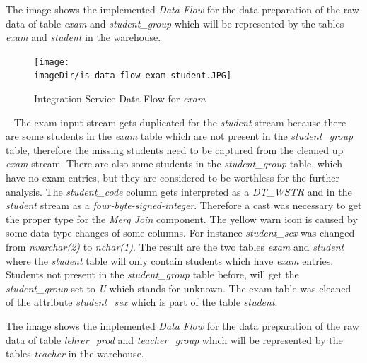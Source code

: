 \documentclass[11pt, a4paper, twoside]{article}   	%
\newcommand{\imageDir}{./images/}
\begin{document}
The image shows the implemented \emph{Data Flow} for the data preparation of the raw data of table \emph{exam} and \emph{student\_group} which will be represented by the tables \emph{exam} and \emph{student} in the warehouse.

\begin{figure}[h]
\centering
\texttt{[image: \\imageDir/is-data-flow-exam-student.JPG]}
\caption{Integration Service Data Flow for \emph{exam}}
\label{fig:is-data-flow-exam}
\end{figure}
\ \newline
The exam input stream gets duplicated for the \emph{student} stream because there are some students in the \emph{exam} table which are not present in the \emph{student\_group} table, therefore the missing students need to be captured from the cleaned up \emph{exam} stream. There are also some students in the \emph{student\_group} table, which have no exam entries, but they are considered to be worthless for the further analysis. The \emph{student\_code} column gets interpreted as a \emph{DT\_WSTR} and in the \emph{student} stream as a \emph{four-byte-signed-integer}. Therefore a cast was necessary to get the proper type for the \emph{Merg Join} component. 
\newline
\newline
The yellow warn icon is caused by some data type changes of some columns. For instance \emph{student\_sex} was changed from \emph{nvarchar(2)} to \emph{nchar(1)}.
\newline
\newline
The result are the two tables \emph{exam} and \emph{student} where the \emph{student} table will only contain students which have \emph{exam} entries. Students not present in the \emph{student\_group} table before, will get the \emph{student\_group} set to \emph{U} which stands for unknown. The exam table was cleaned of the attribute \emph{student\_sex} which is part of the table \emph{student}.
\newpage

The image shows the implemented \emph{Data Flow} for the data preparation of the raw data of table \emph{lehrer\_prod} and \emph{teacher\_group} which will be represented by the tables \emph{teacher} in the warehouse.
\end{document}
